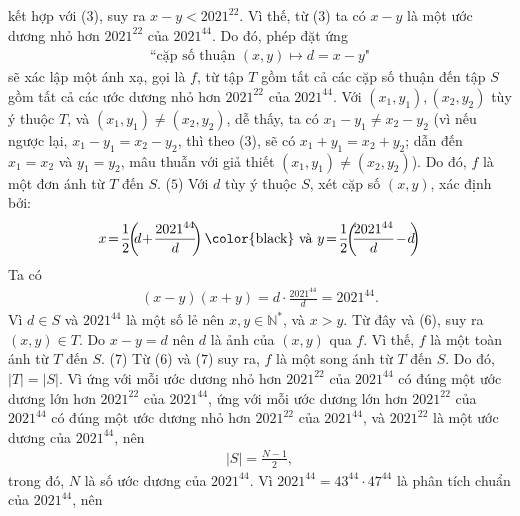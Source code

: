 \begin{multicols}{2}
	kết hợp với ($3$), suy ra $x - y < 2021^{22}$. Vì thế, từ ($3$) ta có $x - y$ là một ước dương nhỏ hơn $2021^{22}$  của $2021^{44}$. Do đó, phép đặt ứng
	\begin{align*}
		\text{``cặp số thuận } (x, y) \mapsto   d = x - y\text{"}
	\end{align*}
	sẽ xác lập một ánh xạ, gọi là $f$, từ tập $T$ gồm tất cả các cặp số thuận đến tập $S$ gồm tất cả các ước dương nhỏ hơn $2021^{22}$  của $2021^{44}$.
	\vskip 0.05cm 
	Với $\left( {{x_1},{y_1}} \right),\left( {{x_2},{y_2}} \right)$  tùy ý thuộc $T$, và $\left( {{x_1},{y_1}} \right) \ne \left( {{x_2},{y_2}} \right)$, dễ thấy, ta có ${x_1} - {y_1} \ne {x_2} - {y_2}$  (vì nếu ngược lại,  ${x_1} - {y_1} = {x_2} - {y_2}$, thì theo ($3$), sẽ có  ${x_1} + {y_1} = {x_2} + {y_2}$; dẫn đến $x_1 = x_2$  và  $y_1 = y_2$, mâu thuẫn với giả thiết  $\left( {{x_1},{y_1}} \right) \ne \left( {{x_2},{y_2}} \right)$). Do đó,  $f$ là một đơn ánh từ $T$ đến $S$. \hfill  ($5$)
	\vskip 0.05cm
	Với $d$ tùy ý thuộc $S$, xét cặp số $(x, y)$, xác định bởi:
	\begin{align*}
		x \!=\! \frac{1}{2}\!\!\left(\!\! {d \!+\! \frac{{{{2021}^{44}}}}{d}} \!\!\right) \text{\color{black} và } y \!=\! \frac{1}{2}\!\!\left(\!\! {\frac{{{{2021}^{44}}}}{d} \!-\! d}\!\! \right)
	\end{align*}
	Ta có
	\begin{align*}
		\left( {x \!-\! y} \right)\!\left( {x \!+\! y} \right) \!=\! d \!\cdot\! \frac{{{{2021}^{44}}}}{d} \!=\! {2021^{44}}. \tag{$6$}
	\end{align*}
	Vì $d \in S$ và $2021^{44}$  là một số lẻ nên $x, y \in \mathbb{N^*}$,  và $x > y$. Từ đây và ($6$), suy ra $(x, y) \in T$.
	\vskip 0.05cm
	Do $x - y = d$ nên $d$ là ảnh của $(x, y)$ qua  $f$. Vì thế,  $f$ là một toàn ánh từ $T$ đến $S$. \hfill ($7$)
	\vskip 0.05cm
	Từ ($6$) và ($7$) suy ra,  $f$ là một song ánh từ $T$ đến $S$. Do đó, $|T| = |S|$.
	\vskip 0.05cm 
	Vì ứng với mỗi ước dương nhỏ hơn $2021^{22}$  của $2021^{44}$  có đúng một ước dương lớn hơn $2021^{22}$  của  $2021^{44}$, ứng với mỗi ước dương lớn hơn $2021^{22}$   của  $2021^{44}$ có đúng một ước dương nhỏ hơn $2021^{22}$  của  $2021^{44}$, và $2021^{22}$  là một ước dương của  $2021^{44}$, nên
	\begin{align*}
		|S| = \frac{{N - 1}}{2},
	\end{align*}
	trong đó, $N$ là số ước dương của $2021^{44}$.
	\vskip 0.05cm
	Vì ${2021^{44}} = {43^{44}} \cdot {47^{44}}$ là phân tích chuẩn của $2021^{44}$, nên
	\begin{align*}

\end{align*}
\end{multicols}
